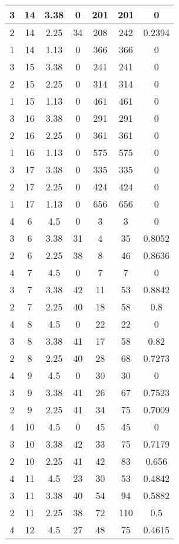 \documentclass[letterpaper, 12pt]{article}
\begin{document}
\begin{longtable}{|c|c|c|c|c|c|c|}
\hline
3 & 14 & 3.38 & 0 & 201 & 201 & 0 \\
\hline
2 & 14 & 2.25 & 34 & 208 & 242 & 0.2394 \\
\hline
1 & 14 & 1.13 & 0 & 366 & 366 & 0 \\
\hline
3 & 15 & 3.38 & 0 & 241 & 241 & 0 \\
\hline
2 & 15 & 2.25 & 0 & 314 & 314 & 0 \\
\hline
1 & 15 & 1.13 & 0 & 461 & 461 & 0 \\
\hline
3 & 16 & 3.38 & 0 & 291 & 291 & 0 \\
\hline
2 & 16 & 2.25 & 0 & 361 & 361 & 0 \\
\hline
1 & 16 & 1.13 & 0 & 575 & 575 & 0 \\
\hline
3 & 17 & 3.38 & 0 & 335 & 335 & 0 \\
\hline
2 & 17 & 2.25 & 0 & 424 & 424 & 0 \\
\hline
1 & 17 & 1.13 & 0 & 656 & 656 & 0 \\
\hline
4 & 6 & 4.5 & 0 & 3 & 3 & 0 \\
\hline
3 & 6 & 3.38 & 31 & 4 & 35 & 0.8052 \\
\hline
2 & 6 & 2.25 & 38 & 8 & 46 & 0.8636 \\
\hline
4 & 7 & 4.5 & 0 & 7 & 7 & 0 \\
\hline
3 & 7 & 3.38 & 42 & 11 & 53 & 0.8842 \\
\hline
2 & 7 & 2.25 & 40 & 18 & 58 & 0.8 \\
\hline
4 & 8 & 4.5 & 0 & 22 & 22 & 0 \\
\hline
3 & 8 & 3.38 & 41 & 17 & 58 & 0.82 \\
\hline
2 & 8 & 2.25 & 40 & 28 & 68 & 0.7273 \\
\hline
4 & 9 & 4.5 & 0 & 30 & 30 & 0 \\
\hline
3 & 9 & 3.38 & 41 & 26 & 67 & 0.7523 \\
\hline
2 & 9 & 2.25 & 41 & 34 & 75 & 0.7009 \\
\hline
4 & 10 & 4.5 & 0 & 45 & 45 & 0 \\
\hline
3 & 10 & 3.38 & 42 & 33 & 75 & 0.7179 \\
\hline
2 & 10 & 2.25 & 41 & 42 & 83 & 0.656 \\
\hline
4 & 11 & 4.5 & 23 & 30 & 53 & 0.4842 \\
\hline
3 & 11 & 3.38 & 40 & 54 & 94 & 0.5882 \\
\hline
2 & 11 & 2.25 & 38 & 72 & 110 & 0.5 \\
\hline
4 & 12 & 4.5 & 27 & 48 & 75 & 0.4615 \\

\end{longtable}
\end{document}
